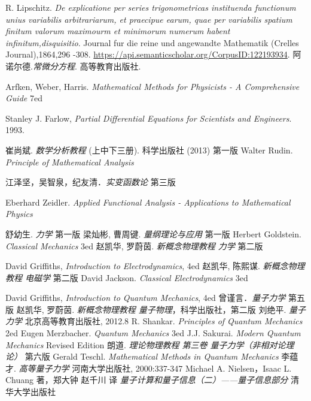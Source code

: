 \begin{thebibliography}{99}
R. Lipschitz. \textsl{De explicatione per series trigonometricas instituenda functionum unius variabilis arbitrariarum, et praecipue earum, quae per variabilis spatium finitum valorum maximourm et minimorum numerum habent infinitum,disquisitio}. Journal fur die reine und angewandte Mathematik (Crelles Journal),1864,296 -308. \href{https://api.semanticscholar.org/CorpusID:122193934}{https://api.semanticscholar.org/CorpusID:122193934}.
阿诺尔德.\textsl{常微分方程}. 高等教育出版社.

Arfken, Weber, Harris. \textsl{Mathematical Methods for Physicists - A Comprehensive Guide} 7ed

Stanley J. Farlow, \textsl{Partial Differential Equations for Scientists and Engineers}. 1993.

崔尚斌. \textsl{数学分析教程} (上中下三册). 科学出版社 (2013) 第一版
Walter Rudin. \textsl{Principle of Mathematical Analysis}

江泽坚，吴智泉，纪友清．\textsl{实变函数论} 第三版

Eberhard Zeidler. \textsl{Applied Functional Analysis - Applications to Mathematical Physics}

舒幼生. \textsl{力学} 第一版
梁灿彬, 曹周键. \textsl{量纲理论与应用} 第一版
Herbert Goldstein. \textsl{Classical Mechanics} 3ed
赵凯华, 罗蔚茵. \textsl{新概念物理教程 力学} 第二版

David Griffiths, \textsl{Introduction to Electrodynamics}, 4ed
赵凯华, 陈熙谋. \textsl{新概念物理教程 电磁学} 第二版
David Jackson. \textsl{Classical Electrodynamics} 3ed

David Griffiths, \textsl{Introduction to Quantum Mechanics}, 4ed
曾谨言．\textsl{量子力学} 第五版
赵凯华, 罗蔚茵. \textsl{新概念物理教程 量子物理}，科学出版社，第二版
刘绝平. \textsl{量子力学} 北京高等教育出版社, 2012.8
R. Shankar. \textsl{Principles of Quantum Mechanics} 2ed
Eugen Merzbacher. \textsl{Quantum  Mechanics} 3ed
J.J. Sakurai. \textsl{Modern Quantum Mechanics} Revised Edition
朗道. \textsl{理论物理教程 第三卷 量子力学（非相对论理论）} 第六版
Gerald Teschl. \textsl{Mathematical Methods in Quantum Mechanics}
李蕴才. \textsl{高等量子力学} 河南大学出版社, 2000:337-347
Michael A. Nielsen，Isaac L. Chuang 著，郑大钟 赵千川 译 \textsl{量子计算和量子信息（二）——量子信息部分} 清华大学出版社


\end{thebibliography}
